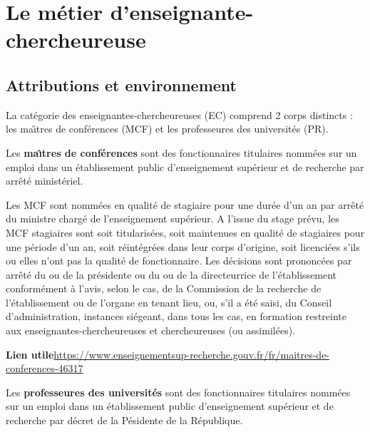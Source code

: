 \chapter{Le m\'etier d'enseignant\mp e-chercheur\mp euse}


\section{Attributions et environnement}
La cat\'egorie des enseignant\mp e\mp s-chercheur\mp euse\mp s (EC) comprend 2 corps distincts :
les ma\^\i tres de conf\'erences (MCF) et les professeur\mp e\mp s des universit\'es (PR).

Les \textbf{ma\^\i  tres de conf\'erences} sont des fonctionnaires titulaires
nomm\'e\mp e\mp s sur un emploi dans un \'etablissement public d'enseignement
sup\'erieur et de recherche par arr\^et\'e minist\'eriel. 

Les MCF sont nomm\'e\mp e\mp s en qualit\'e de stagiaire pour une dur\'ee d'un an par arr\^ et\'e du ministre charg\'e de l'enseignement sup\'erieur.
A l'issue du stage pr\'evu, les MCF stagiaires sont soit titularis\'e\mp e\mp s, soit maintenu\mp e\mp s en qualit\'e de stagiaires pour une p\'eriode d'un an, soit r\'eint\'egr\'e\mp e\mp s dans leur corps d'origine, soit licenci\'e\mp e\mp s s'ils ou elles n'ont pas la qualit\'e de fonctionnaire. Les d\'ecisions sont prononc\'ees par arr\^ et\'e du ou de la pr\'esident\mp e ou du ou de la directeur\mp rice de l'\'etablissement conform\'ement \`a l'avis, selon le cas, de la Commission de la recherche de l'\'etablissement ou de l'organe en tenant lieu, ou, s'il a \'et\'e saisi, du Conseil d'administration, instances si\'egeant, dans tous les cas, en formation restreinte aux enseignant\mp e\mp s-chercheur\mp euse\mp s et chercheur\mp euse\mp s (ou assimil\'e\mp e\mp s).

\textbf{Lien utile\hspace{.5em}}\url{https://www.enseignementsup-recherche.gouv.fr/fr/maitres-de-conferences-46317}

Les \textbf{professeur\mp e\mp s des universit\'es} sont des fonctionnaires titulaires nomm\'e\mp e\mp s sur un emploi dans un \'etablissement public d'enseignement
sup\'erieur et de recherche par d\'ecret de la P\'esident\mp e de la R\'epublique. 

